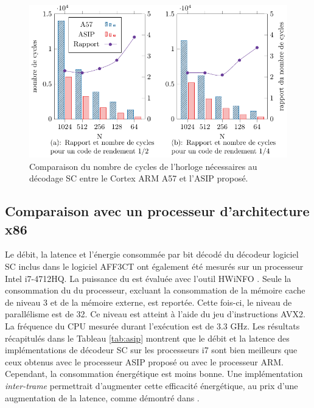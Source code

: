 \begin{figure}[htp]
\centering
\includegraphics{main/ch3_fig/curves/cycle_count/cycle_count}
\caption{Comparaison du nombre de cycles de l'horloge nécessaires au décodage SC entre le Cortex ARM A57 et l'ASIP proposé.}
\label{fig:cycle_count}
\end{figure}

\subsection{Comparaison avec un processeur d'architecture x86}
Le débit, la latence et l'énergie consommée par bit décodé du décodeur logiciel SC inclus dans le logiciel AFF3CT ont également été mesurés sur un processeur Intel i7-4712HQ.
La puissance du \coeur est évaluée avec l'outil HWiNFO \cite{noauthor_hwinfo_nodate}. Seule la consommation du \coeur du processeur, excluant la consommation de la mémoire cache de niveau 3 et de la mémoire externe, est reportée. Cette fois-ci, le niveau de parallélisme est de 32. Ce niveau est atteint à l'aide du jeu d'instructions AVX2. La fréquence du CPU mesurée durant l'exécution est de 3.3 GHz. Les résultats récapitulés dans le Tableau \ref{tab:asip} montrent que le débit et la latence des implémentations de décodeur SC sur les processeurs i7 sont bien meilleurs que ceux obtenus avec le processeur ASIP proposé ou avec le processeur ARM. Cependant, la consommation énergétique est moins bonne. Une implémentation \textit{inter-trame} permettrait d'augmenter cette efficacité énergétique, au prix d'une augmentation de la latence, comme démontré dans \cite{cassagne_energy_2016}.


